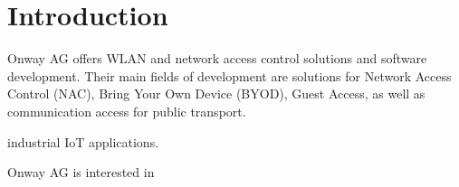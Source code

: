 \section{Introduction}
\label{sec:intro}
Onway AG offers WLAN and network access control solutions and software development. Their main fields of development are solutions for Network Access Control (NAC), Bring Your Own Device (BYOD), Guest Access, as well as communication access for public transport.


industrial IoT applications.

Onway AG is interested in 